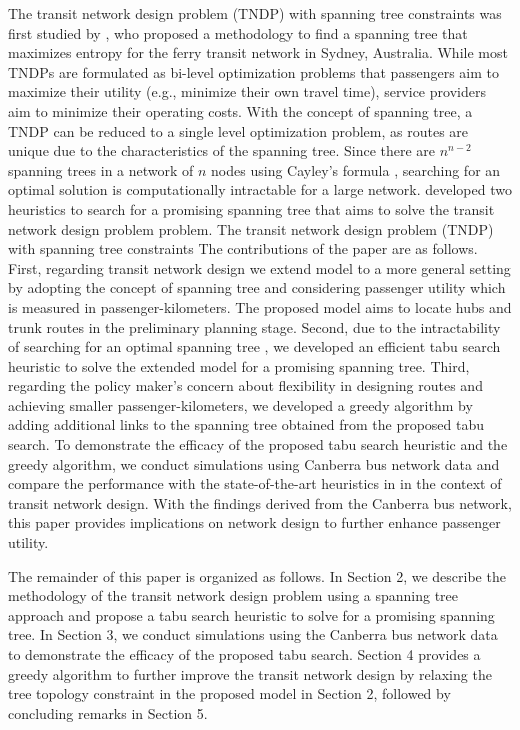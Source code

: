 \documentclass[10pt,english]{article}
\begin{document}
The transit network design problem (TNDP) with spanning tree constraints
was first studied by \citet{Bell2020}, who proposed a methodology to
find a spanning tree that maximizes entropy for the ferry transit
network in Sydney, Australia. While most TNDPs are formulated as
bi-level optimization problems that passengers aim to maximize their
utility (e.g., minimize their own travel time), service providers aim to
minimize their operating costs. With the concept of spanning tree, a
TNDP can be reduced to a single level optimization problem, as routes
are unique due to the characteristics of the spanning tree. Since there
are $n^{n-2}$ spanning trees in a network of $n$ nodes using
Cayley's formula \citet{Cayley1889}, searching for an optimal solution is
computationally intractable for a large network. \citet{Bell2020}
developed two heuristics to search for a promising spanning tree that
aims to solve the transit network design problem problem.
The transit network design problem (TNDP) with spanning tree constraints
The contributions of the paper are as follows. First, regarding transit
network design we extend \citet{Bell2020} model to a more general
setting by adopting the concept of spanning tree and considering
passenger utility which is measured in passenger-kilometers. The
proposed model aims to locate hubs and trunk routes in the preliminary
planning stage. Second, due to the intractability of searching for an
optimal spanning tree \citep{Bell2020, Hu1974, Kayisoglu2021, Rothlauf2009, Tilk2018, Zetina2019}, we
developed an efficient tabu search heuristic to solve the extended model
for a promising spanning tree. Third, regarding the policy maker's
concern about flexibility in designing routes and achieving smaller
passenger-kilometers, we developed a greedy algorithm by adding
additional links to the spanning tree obtained from the proposed tabu
search. To demonstrate the efficacy of the proposed tabu search
heuristic and the greedy algorithm, we conduct simulations using
Canberra bus network data and compare the performance with the
state-of-the-art heuristics in \citet{Bell2020} in the context of
transit network design. With the findings derived from the Canberra bus
network, this paper provides implications on network design to further
enhance passenger utility.

The remainder of this paper is organized as follows. In Section 2, we
describe the methodology of the transit network design problem using a
spanning tree approach and propose a tabu search heuristic to solve for
a promising spanning tree. In Section 3, we conduct simulations using
the Canberra bus network data to demonstrate the efficacy of the
proposed tabu search. Section 4 provides a greedy algorithm to further
improve the transit network design by relaxing the tree topology
constraint in the proposed model in Section 2, followed by concluding
remarks in Section 5.
\end{document}
